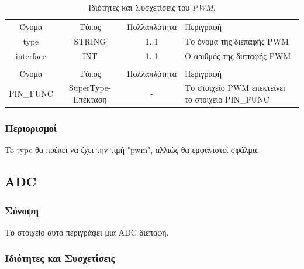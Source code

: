 \begin{table}[H]
	\begin{center}
		\begin{tabular}{ | c | c | c| m{5.5cm} | }
			\hline
			\rowcolor{Gray}
			\multicolumn{4}{|c|}{\textbf{Ιδιότητες}}\\
			\hline
			\rowcolor{Gray}
			Όνομα & Τύπος & Πολλαπλότητα & Περιγραφή \\
			\hline
			type & STRING & 1..1 & Το όνομα της διεπαφής PWM \\
			\hline
			interface & INT & 1..1 & Ο αριθμός της διεπαφής PWM \\
			\hline
			\rowcolor{Gray}
			\multicolumn{4}{|c|}{\textbf{Συσχετίσεις}}\\
			\hline
			\rowcolor{Gray}
			Όνομα & Τύπος & Πολλαπλότητα & Περιγραφή \\
			\hline
			PIN\_FUNC & SuperType-Επέκταση & - &  Το στοιχείο PWM επεκτείνει το στοιχείο PIN\_FUNC \\
			\hline
		\end{tabular}
		\caption{Ιδιότητες και Συσχετίσεις του \textit{PWM}.}
		\label{tab:pwm}
	\end{center}
\end{table}

\subsubsection*{Περιορισμοί}

\noindent To type θα πρέπει να έχει την τιμή "pwm", αλλιώς θα εμφανιστεί σφάλμα.

\subsection{ADC}
\label{subsec:adc}

\subsubsection*{Σύνοψη}

\noindent Το στοιχείο αυτό περιγράφει μια ADC διεπαφή.

\subsubsection*{Ιδιότητες και Συσχετίσεις}

